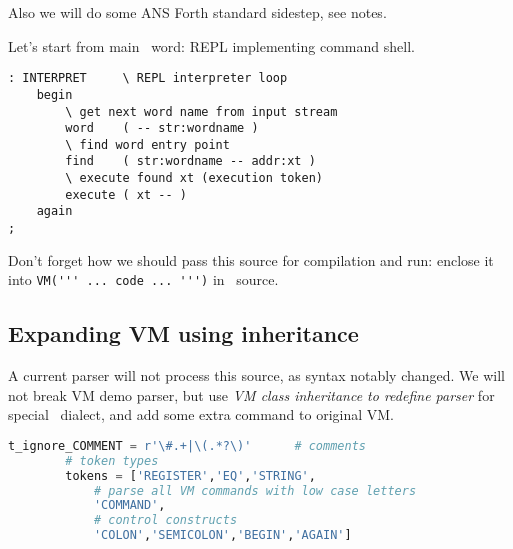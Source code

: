\bigskip
Also we will do some ANS Forth standard sidestep, see notes.

\noindent
Let's start from main \F\ word: REPL implementing
command shell.
\begin{lstlisting}[language=Forth]
: INTERPRET		\ REPL interpreter loop
	begin
		\ get next word name from input stream
		word	( -- str:wordname ) 
		\ find word entry point
		find	( str:wordname -- addr:xt )
		\ execute found xt (execution token) 
		execute	( xt -- ) 
	again
;
\end{lstlisting}
Don't forget how we should pass this source for compilation and run:
enclose it into \verb|VM(''' ... code ... ''')| in \py\ source.

\subsection{Expanding VM using inheritance}

A current parser will not process this source, as syntax notably changed.
We will not break VM demo parser, but use \emph{VM class inheritance to redefine
parser} for special \F\ dialect, and add some extra command to original VM.
\begin{lstlisting}[language=Python]
		t_ignore_COMMENT = r'\#.+|\(.*?\)'		# comments
		# token types
		tokens = ['REGISTER','EQ','STRING',
			# parse all VM commands with low case letters
			'COMMAND',								
			# control constructs
			'COLON','SEMICOLON','BEGIN','AGAIN']	
\end{lstlisting}
